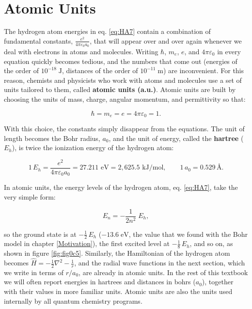 \documentclass[
  english,
  9pt,
]{extbook}
\theoremstyle{definition}
\theoremstyle{definition}
\theoremstyle{definition}
\theoremstyle{definition}
\theoremstyle{remark}
\begin{document}
\section{Atomic Units}\label{AtomicUnits}

The hydrogen atom energies in eq. \eqref{eq:HA7} contain a combination of fundamental constants, \(\frac{e^2}{4\pi\varepsilon_0 a_0}\), that will appear over and over again whenever we deal with electrons in atoms and molecules. Writing \(\hbar\), \(m_e\), \(e\), and \(4\pi\varepsilon_0\) in every equation quickly becomes tedious, and the numbers that come out (energies of the order of \(10^{-18}\;\text{J}\), distances of the order of \(10^{-11}\;\text{m}\)) are inconvenient. For this reason, chemists and physicists who work with atoms and molecules use a set of units tailored to them, called \textbf{atomic units (a.u.)}. Atomic units are built by choosing the units of mass, charge, angular momentum, and permittivity so that:

\begin{equation}
\hbar = m_e = e = 4\pi\varepsilon_0 = 1.
\label{eq:au0}
\end{equation}

With this choice, the constants simply disappear from the equations. The unit of length becomes the Bohr radius, \(a_0\), and the unit of energy, called the \textbf{hartree} (\(E_h\)), is twice the ionization energy of the hydrogen atom:

\begin{equation}
1\,E_h = \frac{e^2}{4\pi\varepsilon_0 a_0} = 27.211\text{ eV} = 2{,}625.5\text{ kJ/mol}, \qquad 1\,a_0 = 0.529\,\text{Å}.
\label{eq:aunits}
\end{equation}

In atomic units, the energy levels of the hydrogen atom, eq. \eqref{eq:HA7}, take the very simple form:

\begin{equation}
E_n = -\frac{1}{2n^2}\;E_h,
\label{eq:HA7au}
\end{equation}

so the ground state is at \(-\frac{1}{2}\,E_h\) (\(-13.6\;\text{eV}\), the value that we found with the Bohr model in chapter \ref{Motivation}), the first excited level at \(-\frac{1}{8}\,E_h\), and so on, as shown in figure \ref{fig:fig0c5}. Similarly, the Hamiltonian of the hydrogen atom becomes \(\hat{H}=-\frac{1}{2}\nabla^2-\frac{1}{r}\), and the radial wave functions in the next section, which we write in terms of \(r/a_0\), are already in atomic units. In the rest of this textbook we will often report energies in hartrees and distances in bohrs (\(a_0\)), together with their values in more familiar units. Atomic units are also the units used internally by all quantum chemistry programs.
\end{document}
